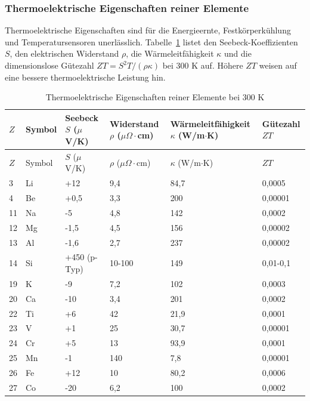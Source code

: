 \documentclass[12pt,a4paper]{article}
\begin{document}
	\subsubsection{Thermoelektrische Eigenschaften reiner Elemente}
	\label{subsec:thermoelectric-properties-func}
	
	Thermoelektrische Eigenschaften sind für die Energieernte, Festkörperkühlung und Temperatursensoren unerlässlich. Tabelle~\ref{tab:thermoelectric-properties-func} listet den Seebeck-Koeffizienten \(S\), den elektrischen Widerstand \(\rho\), die Wärmeleitfähigkeit \(\kappa\) und die dimensionslose Gütezahl \(ZT = S^2 T / (\rho \kappa)\) bei 300 K auf. Höhere \(ZT\) weisen auf eine bessere thermoelektrische Leistung hin.
	
	\begin{longtable}{p{0.8cm}p{1.2cm}p{2.2cm}p{2.2cm}p{2.2cm}p{2.2cm}}
		\caption{Thermoelektrische Eigenschaften reiner Elemente bei 300 K} \label{tab:thermoelectric-properties-func} \\
		\toprule
		\(Z\) & Symbol & Seebeck \(S\) (\(\mu\)V/K) & Widerstand \(\rho\) (\(\mu\Omega\cdot\)cm) & Wärmeleitfähigkeit \(\kappa\) (W/m\(\cdot\)K) & Gütezahl \(ZT\) \\
		\midrule
		\endfirsthead
		\toprule
		\(Z\) & Symbol & \(S\) (\(\mu\)V/K) & \(\rho\) (\(\mu\Omega\cdot\)cm) & \(\kappa\) (W/m\(\cdot\)K) & \(ZT\) \\
		\midrule
		\endhead
		3  & Li & +12 & 9,4 & 84,7 & 0,0005 \\
		4  & Be & +0,5 & 3,3 & 200 & 0,00001 \\
		11 & Na & -5 & 4,8 & 142 & 0,0002 \\
		12 & Mg & -1,5 & 4,5 & 156 & 0,00002 \\
		13 & Al & -1,6 & 2,7 & 237 & 0,00002 \\
		14 & Si & +450 (p-Typ) & 10-100 & 149 & 0,01-0,1 \\
		19 & K  & -9 & 7,2 & 102 & 0,0003 \\
		20 & Ca & -10 & 3,4 & 201 & 0,0002 \\
		22 & Ti & +6 & 42 & 21,9 & 0,0001 \\
		23 & V  & +1 & 25 & 30,7 & 0,00001 \\
		24 & Cr & +5 & 13 & 93,9 & 0,0001 \\
		25 & Mn & -1 & 140 & 7,8 & 0,00001 \\
		26 & Fe & +12 & 10 & 80,2 & 0,0006 \\
		27 & Co & -20 & 6,2 & 100 & 0,0002 \\

\end{longtable}
\end{document}
